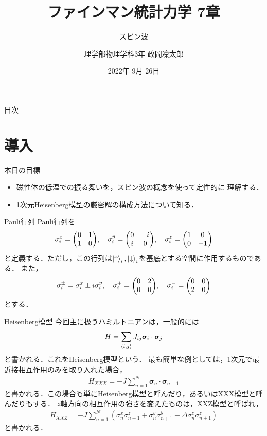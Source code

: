 \documentclass[../main.tex]{subfiles}
\begin{document}
\title{ファインマン統計力学 7章}
\subtitle{スピン波}
\author{理学部物理学科3年 政岡凜太郎}
\date{2022年 9月 26日}
\frame{\titlepage}
\begin{frame}{目次}
    \tableofcontents
\end{frame}
\section{導入}
\begin{frame}{本日の目標}
    \begin{itemize}
        \item 磁性体の低温での振る舞いを，スピン波の概念を使って定性的に
        理解する．
        \item 1次元Heisenberg模型の厳密解の構成方法について知る．
    \end{itemize}
\end{frame}

\begin{frame}{Pauli行列}
    Pauli行列を
    \begin{align}
        \sigma_i^x = \mqty(0&1\\1&0), \quad
        \sigma_i^y = \mqty(0&-i\\i&0),\quad
        \sigma_i^z = \mqty(1&0\\0&-1)
    \end{align}
    と定義する．ただし，この行列は$\ket{\uparrow}_i,\ket{\downarrow}_i$を基底とする空間に作用するものである．
    また，
    \begin{align}
        \sigma_i^{\pm} = \sigma_i^x \pm i\sigma_i^y,
        \quad \sigma_i^+ = \mqty(0&2\\0&0),
        \quad \sigma_i^- = \mqty(0&0\\2&0)
    \end{align}
    とする．
\end{frame}

\begin{frame}{Heisenberg模型}
    今回主に扱うハミルトニアンは，一般的には
    \begin{align}
        H =  \sum_{\expval{i,j}} J_{ij}\bm{\sigma}_i \cdot \bm{\sigma}_j
    \end{align}
    と書かれる．これをHeisenberg模型という．
    最も簡単な例としては，1次元で最近接相互作用のみを取り入れた場合，
    \begin{align}
        H_{XXX} = -J \sum_{n=1}^N \bm{\sigma}_n \cdot \bm{\sigma}_{n+1}
    \end{align}
    と書かれる．この場合も単にHeisenberg模型と呼んだり，あるいはXXX模型と呼んだりもする．
    $z$軸方向の相互作用の強さを変えたものは，XXZ模型と呼ばれ，
    \begin{align}
        H_{XXZ} = -J \sum_{n=1}^N (\sigma_n^x \sigma_{n+1}^z + \sigma_n^y \sigma_{n+1}^y + \Delta \sigma_n^z \sigma_{n+1}^z)
    \end{align}
    と書かれる．
\end{frame}
\end{document}
